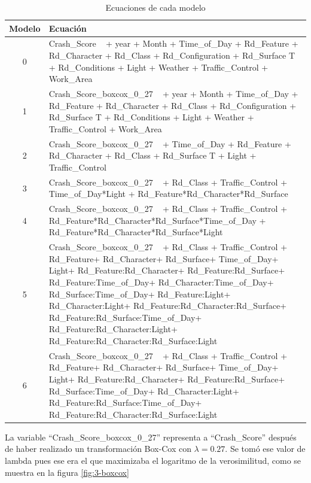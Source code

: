 \documentclass[11pt]{article}
\begin{document}
\begin{table}[H]
    \centering
    \begin{tabular}{c | p{15cm}}
        \hline
        Modelo & Ecuación \\
        \hline
        0 & Crash\_Score ~  + year + Month + Time\_of\_Day + Rd\_Feature   + Rd\_Character   + Rd\_Class   + Rd\_Configuration + Rd\_Surface  T + Rd\_Conditions   + Light   + Weather   + Traffic\_Control   + Work\_Area   \\
        1 & Crash\_Score\_boxcox\_0\_27 ~  + year + Month + Time\_of\_Day + Rd\_Feature   + Rd\_Character   + Rd\_Class   + Rd\_Configuration + Rd\_Surface  T + Rd\_Conditions   + Light   + Weather   + Traffic\_Control   + Work\_Area   \\
        2 & Crash\_Score\_boxcox\_0\_27 ~  + Time\_of\_Day + Rd\_Feature   + Rd\_Character   + Rd\_Class   + Rd\_Surface  T + Light   + Traffic\_Control   \\
        3 & Crash\_Score\_boxcox\_0\_27 ~  + Rd\_Class   + Traffic\_Control   + Time\_of\_Day*Light + Rd\_Feature*Rd\_Character*Rd\_Surface \\
        4 & Crash\_Score\_boxcox\_0\_27 ~  + Rd\_Class   + Traffic\_Control   + Rd\_Feature*Rd\_Character*Rd\_Surface*Time\_of\_Day + Rd\_Feature*Rd\_Character*Rd\_Surface*Light \\
        5 & Crash\_Score\_boxcox\_0\_27 ~ + Rd\_Class + Traffic\_Control + Rd\_Feature+ Rd\_Character+ Rd\_Surface+ Time\_of\_Day+ Light+ Rd\_Feature:Rd\_Character+ Rd\_Feature:Rd\_Surface+ Rd\_Feature:Time\_of\_Day+ Rd\_Character:Time\_of\_Day+ Rd\_Surface:Time\_of\_Day+ Rd\_Feature:Light+ Rd\_Character:Light+ Rd\_Feature:Rd\_Character:Rd\_Surface+ Rd\_Feature:Rd\_Surface:Time\_of\_Day+ Rd\_Feature:Rd\_Character:Light+ Rd\_Feature:Rd\_Character:Rd\_Surface:Light \\
        6 & Crash\_Score\_boxcox\_0\_27 ~ + Rd\_Class + Traffic\_Control + Rd\_Feature+ Rd\_Character+ Rd\_Surface+ Time\_of\_Day+ Light+ Rd\_Feature:Rd\_Character+ Rd\_Feature:Rd\_Surface+ Rd\_Surface:Time\_of\_Day+ Rd\_Character:Light+ Rd\_Feature:Rd\_Surface:Time\_of\_Day+ Rd\_Feature:Rd\_Character:Rd\_Surface:Light \\
        \hline
    \end{tabular}
    \caption{Ecuaciones de cada modelo}
    \label{3-comparison}
\end{table}
La variable ``Crash\_Score\_boxcox\_0\_27'' representa a ``Crash\_Score'' después de haber realizado un transformación Box-Cox con $\lambda = 0.27$. Se tomó ese valor de lambda pues ese era el que maximizaba el logaritmo de la verosimilitud, como se muestra en la figura \ref{fig:3-boxcox}
\end{document}
